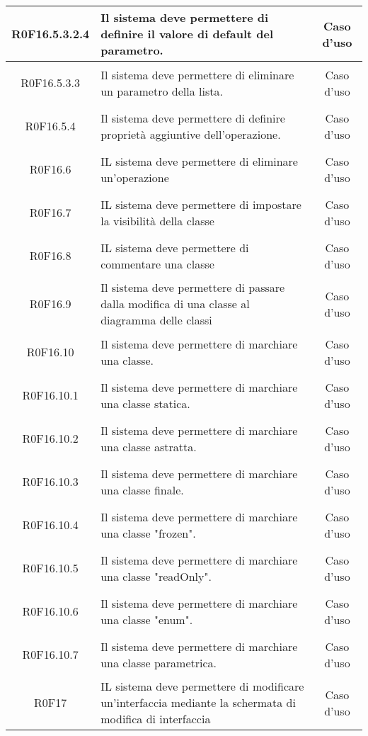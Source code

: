 \documentclass[../AnalisiDeiRequisiti.tex]{subfiles}
\begin{document}
\begin{longtable}{|c|>{\centering}p{7cm}|c|}
\hypertarget{R0F16.5.3.2.4}{R0F16.5.3.2.4} & Il sistema deve permettere di definire il valore di default del parametro.  & Caso d'uso \\ \hline
\hypertarget{R0F16.5.3.3}{R0F16.5.3.3} & Il sistema deve permettere di eliminare un parametro della lista. & Caso d'uso \\ \hline
\hypertarget{R0F16.5.4}{R0F16.5.4} & Il sistema deve permettere di definire proprietà aggiuntive dell'operazione. & Caso d'uso \\ \hline
\hypertarget{R0F16.6}{R0F16.6} & IL sistema deve permettere di eliminare un'operazione  & Caso d'uso \\ \hline
\hypertarget{R0F16.7}{R0F16.7} & IL sistema deve permettere di impostare la visibilità della classe & Caso d'uso \\ \hline
\hypertarget{R0F16.8}{R0F16.8} & IL sistema deve permettere di commentare una classe & Caso d'uso \\ \hline
\hypertarget{R0F16.9}{R0F16.9} & Il sistema deve permettere di passare dalla modifica di una classe al diagramma delle classi	 & Caso d'uso \\ \hline
\hypertarget{R0F16.10}{R0F16.10} & Il sistema deve permettere di marchiare una classe. & Caso d'uso \\ \hline
\hypertarget{R0F16.10.1}{R0F16.10.1} & Il sistema deve permettere di marchiare una classe statica. & Caso d'uso \\ \hline
\hypertarget{R0F16.10.2}{R0F16.10.2} & Il sistema deve permettere di marchiare una classe astratta. & Caso d'uso \\ \hline
\hypertarget{R0F16.10.3}{R0F16.10.3} & Il sistema deve permettere di marchiare una classe finale. & Caso d'uso \\ \hline
\hypertarget{R0F16.10.4}{R0F16.10.4} & Il sistema deve permettere di marchiare una classe "frozen". & Caso d'uso \\ \hline
\hypertarget{R0F16.10.5}{R0F16.10.5} & Il sistema deve permettere di marchiare una classe "readOnly". & Caso d'uso \\ \hline
\hypertarget{R0F16.10.6}{R0F16.10.6} & Il sistema deve permettere di marchiare una classe "enum". & Caso d'uso \\ \hline
\hypertarget{R0F16.10.7}{R0F16.10.7} & Il sistema deve permettere di marchiare una classe parametrica. & Caso d'uso \\ \hline
\hypertarget{R0F17}{R0F17} & IL sistema deve permettere di modificare un'interfaccia mediante la schermata di modifica di interfaccia & Caso d'uso \\ \hline

\end{longtable}
\end{document}
